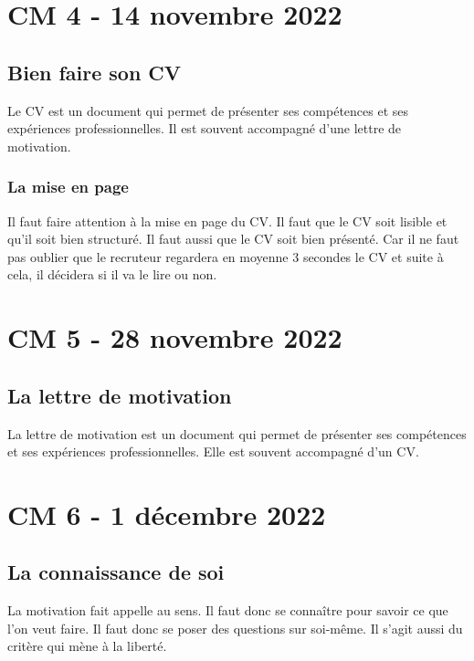 \documentclass[12pt, a4paper]{article}
\begin{document}
\newpage

\section{CM 4 - 14 novembre 2022}
\subsection{Bien faire son CV}

Le CV est un document qui permet de présenter ses compétences et ses expériences
professionnelles. Il est souvent accompagné d'une lettre de motivation.\\

\subsubsection{La mise en page}

Il faut faire attention à la mise en page du CV. Il faut que le CV soit lisible
et qu'il soit bien structuré. Il faut aussi que le CV soit bien présenté. Car
il ne faut pas oublier que le recruteur regardera en moyenne 3 secondes le CV
et suite à cela, il décidera si il va le lire ou non.\\

\newpage
\section{CM 5 - 28 novembre 2022}
\subsection{La lettre de motivation}

La lettre de motivation est un document qui permet de présenter ses compétences
et ses expériences professionnelles. Elle est souvent accompagné d'un CV.\\

\section{CM 6 - 1 décembre 2022}
\subsection{La connaissance de soi}
La motivation fait appelle au sens. Il faut donc se connaître pour savoir ce
que l'on veut faire. Il faut donc se poser des questions sur soi-même. Il s'agit aussi
du critère qui mène à la liberté.
\end{document}
